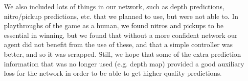 \documentclass{article}
\begin{document}
We also included lots of things in our network, such as depth predictions, nitro/pickup predictions, etc. that we planned to use, but were not able to. In playthroughs of the game as a human, we found nitros and pickups to be essential in winning, but we found that without a more confident network our agent did not benefit from the use of these, and that a simple controller was better, and so it was scrapped. Still, we hope that some of the extra prediction information that was no longer used (e.g. depth map) provided a good auxiliary loss for the network in order to be able to get higher quality predictions.
\end{document}
